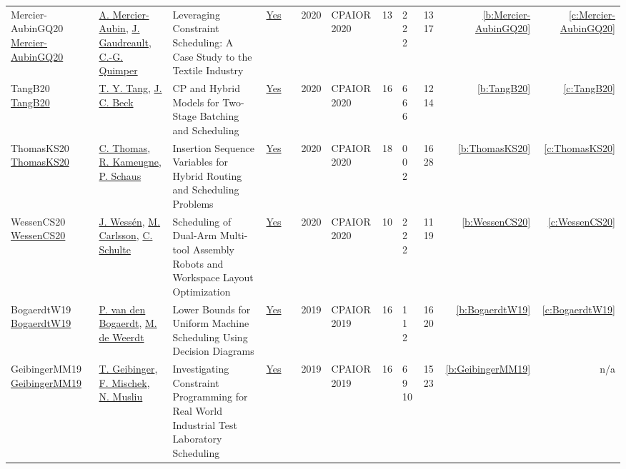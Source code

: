 {\begin{longtable}{>{\raggedright\arraybackslash}p{3cm}>{\raggedright\arraybackslash}p{4.5cm}>{\raggedright\arraybackslash}p{6.0cm}rrrp{2.5cm}rp{1cm}p{1cm}rr}
Mercier-AubinGQ20 \href{https://doi.org/10.1007/978-3-030-58942-4_22}{Mercier-AubinGQ20} & \hyperref[auth:a86]{A. Mercier-Aubin}, \hyperref[auth:a87]{J. Gaudreault}, \hyperref[auth:a37]{C.-G. Quimper} & Leveraging Constraint Scheduling: {A} Case Study to the Textile Industry & \href{../works/Mercier-AubinGQ20.pdf}{Yes} & \cite{Mercier-AubinGQ20} & 2020 & CPAIOR 2020 & 13 & 2 2 2 & 13 17 & \ref{b:Mercier-AubinGQ20} & \ref{c:Mercier-AubinGQ20}\\
TangB20 \href{https://doi.org/10.1007/978-3-030-58942-4_28}{TangB20} & \hyperref[auth:a88]{T. Y. Tang}, \hyperref[auth:a89]{J. C. Beck} & {CP} and Hybrid Models for Two-Stage Batching and Scheduling & \href{../works/TangB20.pdf}{Yes} & \cite{TangB20} & 2020 & CPAIOR 2020 & 16 & 6 6 6 & 12 14 & \ref{b:TangB20} & \ref{c:TangB20}\\
ThomasKS20 \href{https://doi.org/10.1007/978-3-030-58942-4_30}{ThomasKS20} & \hyperref[auth:a834]{C. Thomas}, \hyperref[auth:a10]{R. Kameugne}, \hyperref[auth:a147]{P. Schaus} & Insertion Sequence Variables for Hybrid Routing and Scheduling Problems & \href{../works/ThomasKS20.pdf}{Yes} & \cite{ThomasKS20} & 2020 & CPAIOR 2020 & 18 & 0 0 2 & 16 28 & \ref{b:ThomasKS20} & \ref{c:ThomasKS20}\\
WessenCS20 \href{https://doi.org/10.1007/978-3-030-58942-4_33}{WessenCS20} & \hyperref[auth:a90]{J. Wess{\'{e}}n}, \hyperref[auth:a91]{M. Carlsson}, \hyperref[auth:a92]{C. Schulte} & \cellcolor{green!10}Scheduling of Dual-Arm Multi-tool Assembly Robots and Workspace Layout Optimization & \href{../works/WessenCS20.pdf}{Yes} & \cite{WessenCS20} & 2020 & CPAIOR 2020 & 10 & 2 2 2 & 11 19 & \ref{b:WessenCS20} & \ref{c:WessenCS20}\\
BogaerdtW19 \href{https://doi.org/10.1007/978-3-030-19212-9_38}{BogaerdtW19} & \hyperref[auth:a307]{P. van den Bogaerdt}, \hyperref[auth:a308]{M. de Weerdt} & \cellcolor{green!10}Lower Bounds for Uniform Machine Scheduling Using Decision Diagrams & \href{../works/BogaerdtW19.pdf}{Yes} & \cite{BogaerdtW19} & 2019 & CPAIOR 2019 & 16 & 1 1 2 & 16 20 & \ref{b:BogaerdtW19} & \ref{c:BogaerdtW19}\\
GeibingerMM19 \href{https://doi.org/10.1007/978-3-030-19212-9_20}{GeibingerMM19} & \hyperref[auth:a77]{T. Geibinger}, \hyperref[auth:a80]{F. Mischek}, \hyperref[auth:a45]{N. Musliu} & Investigating Constraint Programming for Real World Industrial Test Laboratory Scheduling & \href{../works/GeibingerMM19.pdf}{Yes} & \cite{GeibingerMM19} & 2019 & CPAIOR 2019 & 16 & 6 9 10 & 15 23 & \ref{b:GeibingerMM19} & n/a\\

\end{longtable}}
